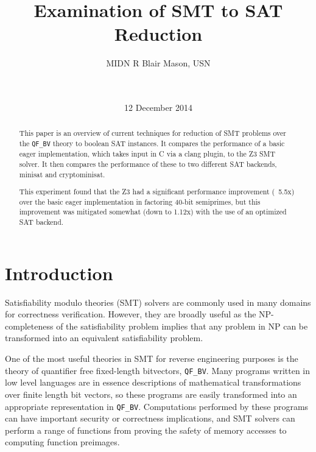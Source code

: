 \documentclass{sig-alternate}
\begin{document}

\title{Examination of SMT to SAT Reduction}

\author{
\alignauthor
MIDN R Blair Mason, USN\\
   \\
   \\
}
\date{12 December 2014}

\maketitle

\begin{abstract}
This paper is an overview of current techniques for reduction of
SMT problems over the \texttt{QF\_BV} theory to boolean SAT instances.
It compares the performance of a basic eager implementation, which
takes input in C via a clang plugin, to the Z3 SMT solver.  It then
compares the performance of these to two different SAT backends,
minisat and cryptominisat.

This experiment found that the Z3 had a significant performance
improvement (~5.5x) over the basic eager implementation in factoring
40-bit semiprimes, but this improvement was mitigated somewhat (down
to 1.12x) with the use of an optimized SAT backend.
\end{abstract}

\section{Introduction}
Satisfiability modulo theories (SMT) solvers are commonly used in many
domains for correctness verification.  However, they are broadly useful
as the NP-completeness of the satisfiability problem implies that any
problem in NP can be transformed into an equivalent satisfiability
problem.

One of the most useful theories in SMT for reverse engineering purposes
is the theory of quantifier free fixed-length bitvectors, 
\texttt{QF\_BV}.  Many programs written in low level languages are in
essence descriptions of mathematical transformations over finite length
bit vectors, so these programs are easily transformed into an appropriate
representation in \texttt{QF\_BV}.  Computations performed by these
programs can have important security or correctness implications, and
SMT solvers can perform a range of functions from proving the safety of
memory accesses to computing function preimages.
\end{document}
